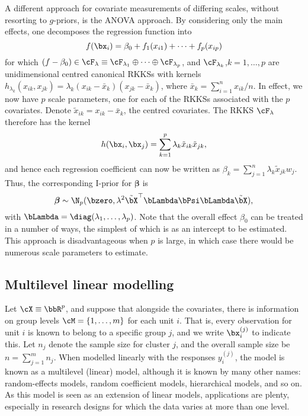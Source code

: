 A different approach for covariate measurements of differing scales, without resorting to $g$-priors, is the ANOVA approach.
By considering only the main effects, one decomposes the regression function into
\[
  f(\bx_i) = \beta_0 + f_1(x_{i1}) + \cdots + f_p(x_{ip}) 
\]
for which $(f-\beta_0) \in \cF_\lambda \equiv \cF_{\lambda_1}\oplus\cdots\oplus\cF_{\lambda_p}$, and $\cF_{\lambda_k}$,$k=1,\dots,p$ are unidimensional centred canonical RKKSs with kernels $h_{\lambda_k}(x_{ik},x_{jk}) = \lambda_k (x_{ik}-\bar x_k) (x_{jk}-\bar x_k)$, where $\bar x_k = \sum_{i=1}^n x_{ik}/n$.
In effect, we now have $p$ scale parameters, one for each of the RKKSs associated with the $p$ covariates.
Denote $\tilde x_{ik} = x_{ik}-\bar x_k$, the centred covariates.
The RKKS $\cF_\lambda$ therefore has the kernel
\[
  h(\bx_i,\bx_j) = \sum_{k=1}^p \lambda_k \tilde x_{ik}\tilde x_{jk},
\]
and hence each regression coefficient can now be written as $\beta_k =  \sum_{j=1}^n  \lambda_k \tilde x_{jk}w_j$.
Thus, the corresponding I-prior for $\boldsymbol{\beta}$ is
\[
  \boldsymbol{\beta} \sim \N_p(\bzero, \lambda^2 \tilde\bX^\top\bLambda \bPsi \bLambda \tilde\bX),
\]
with $\bLambda = \diag(\lambda_1,\dots,\lambda_p)$.
Note that the overall effect $\beta_0$ can be treated in a number of ways, the simplest of which is as an intercept to be estimated.
This approach is disadvantageous when $p$ is large, in which case there would be numerous scale parameters to estimate.


\subsection{Multilevel linear modelling}
\label{sec:multilevelmodels}

Let $\cX\equiv\bbR^p$, and suppose that alongside the covariates, there is information on group levels $\cM= \{1,\dots,m\}$ for each unit $i$.
That is, every observation for unit $i$ is known to belong to a specific group $j$, and we write $\bx_i^{(j)}$ to indicate this.
Let $n_j$ denote the sample size for cluster $j$, and the overall sample size be $n = \sum_{j=1}^m n_j$.
When modelled linearly with the responses $y_i^{(j)}$, the model is known as a multilevel (linear) model, although it is known by many other names: random-effects models, random coefficient models, hierarchical models, and so on.
As this model is seen as an extension of linear models, applications are plenty, especially in research designs for which the data varies at more than one level.

